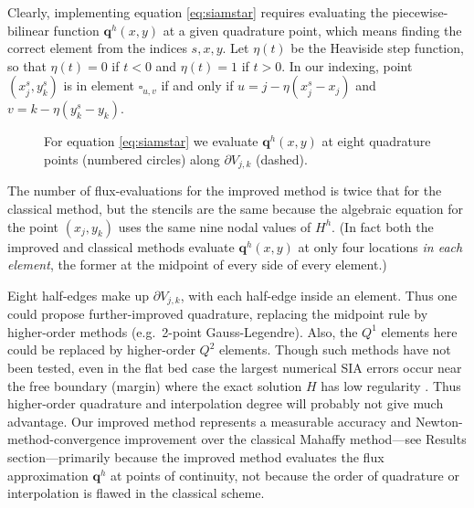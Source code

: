 \documentclass[twocolumn,letterpaper]{igs}
\newcommand\bq{\mathbf{q}}
\begin{document}
Clearly, implementing equation \eqref{eq:siamstar} requires evaluating the piecewise-bilinear function $\bq^h(x,y)$ at a given quadrature point, which means finding the correct element from the indices $s,x,y$.  Let $\eta(t)$ be the Heaviside step function, so that $\eta(t)=0$ if $t<0$ and $\eta(t)=1$ if $t>0$.  In our indexing, point $(x_j^s,y_k^s)$ is in element $\square_{u,v}$ if and only if $u = j-\eta(x_j^s-x_j)$ and $v=k-\eta(y_k^s-y_k)$.

\begin{figure}[ht]
\begin{center}

\end{center}
\caption{For equation \eqref{eq:siamstar} we evaluate $\bq^h(x,y)$ at eight quadrature points (numbered circles) along $\partial V_{j,k}$ (dashed).}
\label{fig:improvequadrature}
\end{figure}

The number of flux-evaluations for the improved method is twice that for the classical method, but the stencils are the same because the algebraic equation for the point $(x_j,y_k)$ uses the same nine nodal values of $H^h$.  (In fact both the improved and classical methods evaluate $\bq^h(x,y)$ at only four locations \emph{in each element}, the former at the midpoint of every side of every element.)

Eight half-edges make up $\partial V_{j,k}$, with each half-edge inside an element.  Thus one could propose further-improved quadrature, replacing the midpoint rule by higher-order methods (e.g.~2-point Gauss-Legendre).  Also, the $Q^1$ elements here could be replaced by higher-order $Q^2$ elements.  Though such methods have not been tested, even in the flat bed case the largest numerical SIA errors occur near the free boundary (margin) where the exact solution $H$ has low regularity \citep{Bueleretal2005}.  Thus higher-order quadrature and interpolation degree will probably not give much advantage.  Our improved method represents a measurable accuracy and Newton-method-convergence improvement over the classical Mahaffy method---see Results section---primarily because the improved method evaluates the flux approximation $\bq^h$ at points of continuity, not because the order of quadrature or interpolation is flawed in the classical scheme.
\end{document}
